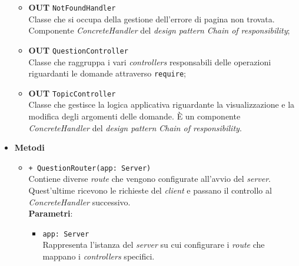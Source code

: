 \begin{itemize}
\begin{itemize}
			\item \textbf{OUT} \texttt{NotFoundHandler}\\
			Classe che si occupa della gestione dell’errore di pagina non trovata. Componente \textit{ConcreteHandler} del \textit{design pattern} \textit{Chain of responsibility};
			\item \textbf{OUT} \texttt{QuestionController}\\
			Classe che raggruppa i vari \textit{controllers} responsabili delle operazioni riguardanti le domande attraverso \texttt{require};
			\item \textbf{OUT} \texttt{TopicController} \\
			Classe che gestisce la logica applicativa riguardante la visualizzazione e la modifica degli argomenti delle domande. È un componente \textit{ConcreteHandler} del \textit{design pattern} \textit{Chain of responsibility}.
		\end{itemize}
		\item \textbf{Metodi} \\
		\begin{itemize}
			\item \texttt{+ QuestionRouter(app: Server)}\\
			Contiene diverse \textit{route} che vengono configurate all’avvio del \textit{server}. Quest’ultime ricevono le richieste del \textit{client} e passano il controllo al \textit{ConcreteHandler} successivo.\\
			\textbf{Parametri}:
			\begin{itemize}
				\item \texttt{app: Server}\\
				Rappresenta l’istanza del \textit{server} su cui configurare i \textit{route} che mappano i \textit{controllers} specifici.
			\end{itemize}
		\end{itemize}
	\end{itemize}